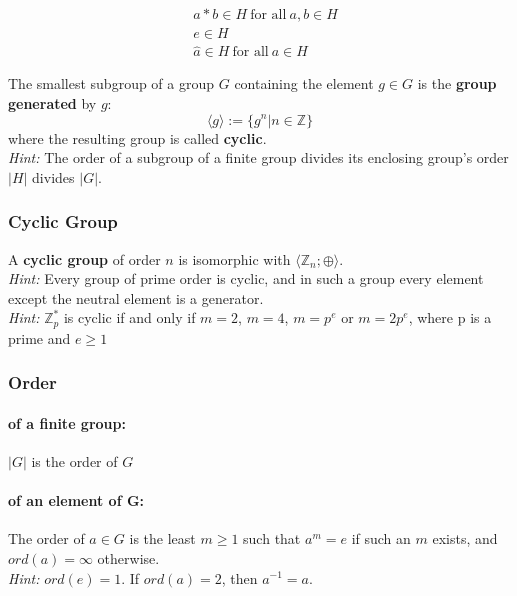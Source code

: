 \documentclass[11pt]{article}
\begin{document}
\begin{equation*}
\begin{split}
	& a * b \in H \ \text{for all}\ a,b \in H \\
	& e \in H \\
	& \hat{a} \in H  \ \text{for all}\ a \in H
\end{split}
\end{equation*}

The smallest subgroup of a group $G$ containing the element $g \in G$ is the \textbf{group generated} by $g$:
\begin{equation*}
	\langle g \rangle := \{g^n | n \in \mathbb{Z} \}
\end{equation*}
where the resulting group is called \textbf{cyclic}.\\

\emph{Hint:} The order of a subgroup of a finite group divides its enclosing group's order $|H|$ divides $|G|$.

\subsubsection{Cyclic Group}

A \textbf{cyclic group} of order $n$ is isomorphic with $\langle \mathbb{Z}_n;\oplus\rangle$. \\

\emph{Hint:} Every group of prime order is cyclic, and in such a group every element except the neutral element is a generator. \\
\emph{Hint:} $\mathbb{Z}_p^*$ is cyclic if and only if $m=2$, $m = 4$, $m = p^e$ or $m = 2p^e$, where p is a prime and $e \geq 1$

\subsubsection{Order}

\paragraph{of a finite group:} $|G|$ is the order of $G$ 
\paragraph{of an element of G:}
The order of $a \in G$ is the least $m \geq 1$ such that $a^m = e$ if such an $m$ exists, and $ord(a) = \infty$ otherwise. \\
\emph{Hint:}  $ord(e) = 1$. If $ord(a) = 2$, then $a^{-1} = a$.
\end{document}
